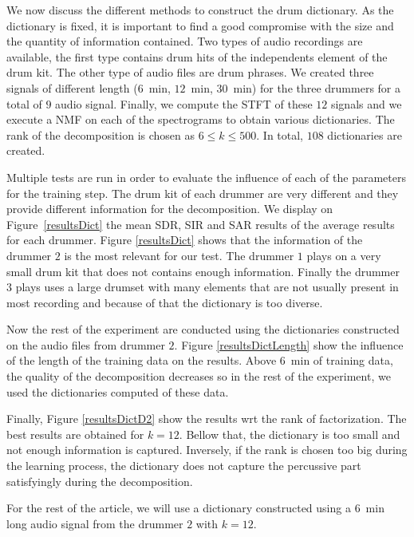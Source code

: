 We now discuss the different methods to construct the drum dictionary. As the dictionary is fixed, it is important to find a good compromise with the size and the quantity of information contained. 
Two types of audio recordings are available, the first type contains drum hits of the independents element of the drum kit. %
The other type of audio files are drum phrases. We created three signals of different length ($6$~min, $12$~min, $30$~min) for the three drummers for a total of $9$ audio signal. 
Finally, we compute the STFT of these $12$ signals and we execute a NMF on each of the spectrograms to obtain various dictionaries. The rank of the decomposition is chosen as $6 \le k  \le 500$. In total, $108$ dictionaries are created. 

Multiple tests are run in order to evaluate the influence of each of the parameters for the training step. The drum kit of each drummer are very different and they provide different information for the decomposition. We display on Figure~\ref{resultsDict} the mean SDR, SIR and SAR results of the average results for each drummer. Figure \ref{resultsDict} shows that the information of the drummer $2$ is the most relevant for our test. The drummer $1$ plays on a very small drum kit that does not contains enough information. Finally the drummer $3$ plays uses a large drumset with many elements that are not usually present in most recording and because of that the dictionary is too diverse.

Now the rest of the experiment are conducted using the dictionaries constructed on the audio files from drummer $2$. Figure \ref{resultsDictLength} show the influence of the length of the training data on the results. Above $6$~min of training data, the quality of the decomposition decreases so in the rest of the experiment, we used the dictionaries computed of these data.

Finally, Figure \ref{resultsDictD2} show the results wrt the rank of factorization. The best results are obtained for $k=12$. Bellow that, the dictionary is too small and not enough information is captured. Inversely, if the rank is chosen too big during the learning process, the dictionary does not capture the percussive part satisfyingly during the decomposition.

For the rest of the article, we will use a dictionary constructed using a $6$~min long audio signal from the drummer $2$ with $k=12$.


